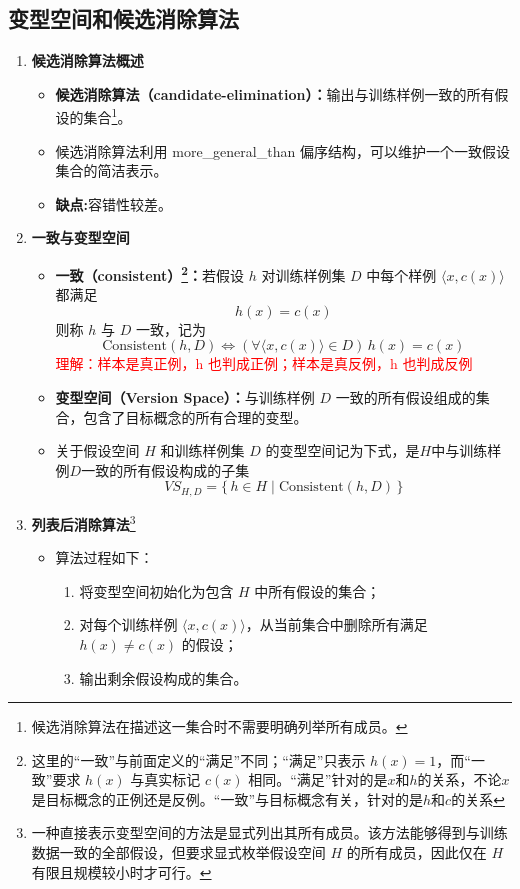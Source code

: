 \documentclass[../main.tex]{subfiles}
\begin{document}
\subsection{变型空间和候选消除算法}\label{sec:candidate-elimination}
\begin{enumerate}
    \item \textbf{候选消除算法概述}
    \begin{itemize}
        \item \textbf{候选消除算法（candidate-elimination）：}输出与训练样例一致的所有假设的集合\footnote{候选消除算法在描述这一集合时不需要明确列举所有成员。}。
        \item 候选消除算法利用 more\_general\_than 偏序结构，可以维护一个一致假设集合的简洁表示。
        \item \textbf{缺点:}容错性较差。
    \end{itemize}

    \item \textbf{一致与变型空间}
    \begin{itemize}
        \item \textbf{一致（consistent）\footnote{这里的“一致”与前面定义的“满足”不同；“满足”只表示 $h(x)=1$，而“一致”要求 $h(x)$ 与真实标记 $c(x)$ 相同。“满足”针对的是$x$和$h$的关系，不论$x$是目标概念的正例还是反例。“一致”与目标概念有关，针对的是$h$和$c$的关系}：}若假设 $h$ 对训练样例集 $D$ 中每个样例 $\langle x, c(x) \rangle$ 都满足
        \[
            h(x) = c(x)
        \]
        则称 $h$ 与 $D$ 一致，记为
        \[
            \mathrm{Consistent}(h,D) \iff (\forall \langle x,c(x)\rangle \in D)\, h(x)=c(x)
        \]
        \textcolor{red}{理解：样本是真正例，h 也判成正例；样本是真反例，h 也判成反例}
        \item \textbf{变型空间（Version Space）：}与训练样例 $D$ 一致的所有假设组成的集合，包含了目标概念的所有合理的变型。
        \item 关于假设空间 $H$ 和训练样例集 $D$ 的变型空间记为下式，是$H$中与训练样例$D$一致的所有假设构成的子集
        \[
            VS_{H,D}=\{\,h\in H \mid \mathrm{Consistent}(h,D)\,\}
        \]
    \end{itemize}

    \item \textbf{列表后消除算法}\footnote{一种直接表示变型空间的方法是显式列出其所有成员。该方法能够得到与训练数据一致的全部假设，但要求显式枚举假设空间 $H$ 的所有成员，因此仅在 $H$ 有限且规模较小时才可行。}
    \begin{itemize}
        \item 算法过程如下：
        \begin{enumerate}
            \item 将变型空间初始化为包含 $H$ 中所有假设的集合；
            \item 对每个训练样例 $\langle x,c(x)\rangle$，从当前集合中删除所有满足
            $
                h(x)\neq c(x)
            $
            的假设；
            \item 输出剩余假设构成的集合。
        \end{enumerate}
    \end{itemize}


\end{enumerate}
\end{document}
